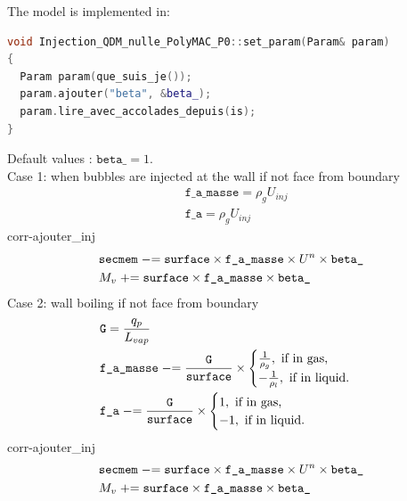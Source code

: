The model is implemented in:
\begin{lstlisting}[language=c++]
void Injection_QDM_nulle_PolyMAC_P0::set_param(Param& param)
{
  Param param(que_suis_je());
  param.ajouter("beta", &beta_);
  param.lire_avec_accolades_depuis(is);
}
\end{lstlisting}
Default values : $\texttt{beta\_} =1$.\\
Case 1: when bubbles are injected at the wall if not face from boundary
\begin{align}
    &\texttt{f\_a\_masse}=\rho_g U_{inj}\\
    &\texttt{f\_a}=\rho_g U_{inj}
\end{align}
corr-ajouter\_inj
\begin{align}
  &\texttt{secmem} \mathrel{-}= \texttt{surface}\times \texttt{f\_a\_masse}\times U^n\times \texttt{beta\_}\\
  &M_v \mathrel{+}= \texttt{surface}\times \texttt{f\_a\_masse}\times \texttt{beta\_}
\end{align}
Case 2: wall boiling if not face from boundary
\begin{align}
&\texttt{G}=\frac{q_p}{L_{vap}}\\
&\texttt{f\_a\_masse}  \mathrel{-}= \frac{\texttt{G}}{\texttt{surface}}\times \begin{cases} \frac{1}{\rho_g},\text{ if in gas,}\\-\frac{1}{\rho_l},\text{ if in liquid.} \end{cases}\\
&\texttt{f\_a}  \mathrel{-}= \frac{\texttt{G}}{\texttt{surface}}\times \begin{cases} 1,\text{ if in gas,}\\-1,\text{ if in liquid.}\end{cases}
\end{align}
corr-ajouter\_inj
\begin{align}
  &\texttt{secmem}  \mathrel{-}=  \texttt{surface} \times \texttt{f\_a\_masse}\times U^n\times \texttt{beta\_}\\
  &M_v \mathrel{+}= \texttt{surface}\times \texttt{f\_a\_masse}\times \texttt{beta\_}
\end{align}

